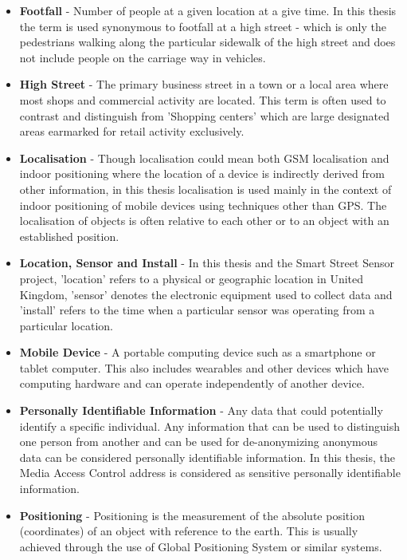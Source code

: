 \begin{itemize}
  \item \textbf{Footfall} - Number of people at a given location at a give time. In this thesis the term is used synonymous to footfall at a high street - which is only the pedestrians walking along the particular sidewalk of the high street and does not include people on the carriage way in vehicles.

  \item \textbf{High Street} - The primary business street in a town or a local area where most shops and commercial activity are located. This term is often used to contrast and distinguish from 'Shopping centers' which are large designated areas earmarked for retail activity exclusively.
    
  \item \textbf{Localisation} - Though localisation could mean both GSM localisation and indoor positioning where the location of a device is indirectly derived from other information, in this thesis localisation is used mainly in the context of indoor positioning of mobile devices using techniques other than GPS. The localisation of objects is often relative to each other or to an object with an established position.
    
  \item \textbf{Location, Sensor and Install} - In this thesis and the Smart Street Sensor project, 'location' refers to a physical or geographic location in United Kingdom, 'sensor' denotes the electronic equipment used to collect data and 'install' refers to the time when a particular sensor was operating from a particular location.
    
  \item \textbf{Mobile Device} - A portable computing device such as a smartphone or tablet computer. This also includes wearables and other devices which have computing hardware and can operate independently of another device.
    
  \item \textbf{Personally Identifiable Information} - Any data that could potentially identify a specific individual. Any information that can be used to distinguish one person from another and can be used for de-anonymizing anonymous data can be considered personally identifiable information. In this thesis, the Media Access Control address is considered as sensitive personally identifiable information. 
    
  \item \textbf{Positioning} - Positioning is the measurement of the absolute position (coordinates) of an object with reference to the earth. This is usually achieved through the use of Global Positioning System or similar systems.


\end{itemize}
